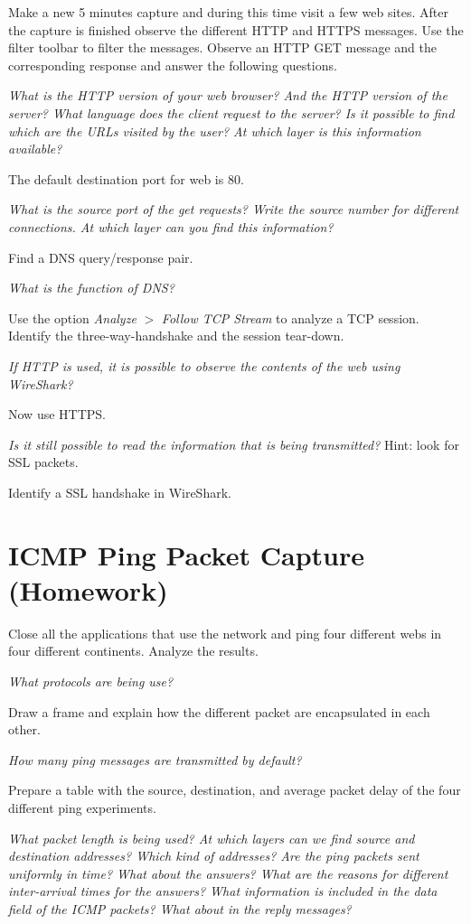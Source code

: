 Make a new 5 minutes capture and during this time visit a few web sites. After the capture is finished observe the different HTTP and HTTPS messages.
Use the filter toolbar to filter the messages. Observe an HTTP GET message and the corresponding response and answer the following questions.

\emph{What is the HTTP version of your web browser? And the HTTP version of the server? What language does the client request to the server? Is it possible to find which are the URLs visited by the user? At which layer is this information available?}

The default destination port for web is 80.

\emph{What is the source port of the get requests? Write the source number for different connections. At which layer can you find this information?}

Find a DNS query/response pair.

\emph{What is the function of DNS?}

Use the option \emph{Analyze} $>$ \emph{Follow TCP Stream} to analyze a TCP session. Identify the three-way-handshake and the session tear-down.

\emph{If HTTP is used, it is possible to observe the contents of the web using WireShark?}

Now use HTTPS.

\emph{Is it still possible to read the information that is being transmitted?} Hint: look for SSL packets.

Identify a SSL handshake in WireShark.

\section{ICMP Ping Packet Capture (Homework)}

Close all the applications that use the network and ping four different webs in four different continents. Analyze the results.

\emph{What protocols are being use?}

Draw a frame and explain how the different packet are encapsulated in each other.

\emph{How many ping messages are transmitted by default?}

Prepare a table with the source, destination, and average packet delay  of the four different ping experiments.

\emph{What packet length is being used? At which layers can we find source and destination addresses? Which kind of addresses? Are the ping packets sent uniformly in time? What about the answers? What are the reasons for different inter-arrival times for the answers? What information is included in the data field of the ICMP packets? What about in the reply messages?}

